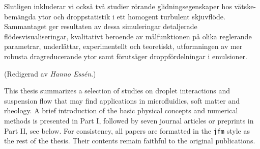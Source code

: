 \begin{abstrakt}
Slutligen inkluderar vi också två studier rörande glidningsegenskaper hos vätske-bemängda ytor och droppstatistik i ett homogent turbulent skjuvflöde. Sammantaget ger resultaten av dessa simuleringar detaljerade flödesvisualiseringar, kvalitativt beroende av målfunktionen på olika reglerande parametrar,
underlättar, experimentellt och teoretiskt, utformningen av mer robusta dragreducerande ytor samt förutsäger droppfördelningar i emulsioner.

\noindent
{\small (Redigerad av {\it Hanno Essén}.)}
%
%
\end{abstrakt}


%
\begin{preface}
	This thesis summarizes a selection of studies on droplet interactions and suspension flow
        that may find applications in microfluidics, soft matter and rheology.
        A brief introduction of the basic physical concepts and numerical methods is presented in Part I,
        followed by seven journal articles or preprints in Part II, see below.
        For consistency, all papers are formatted in the \texttt{jfm} style as the rest of the thesis.
        Their contents remain faithful to the original publications.
\end{preface}


